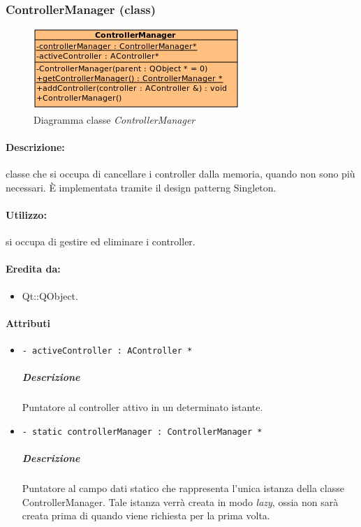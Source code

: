 	\subsubsection{ControllerManager (class)}
	\begin{figure}[!h]
		\centering
		\includegraphics[scale=2.75]{./Content/Immagini/controller/ControllerManager}
		\caption{Diagramma classe \textsl{ControllerManager}}
	\end{figure}
	\paragraph{Descrizione:} classe che si occupa di cancellare i controller dalla memoria, quando non sono più necessari. È implementata tramite il design patterng\g{} Singleton.
	\paragraph{Utilizzo:} si occupa di gestire ed eliminare i controller.
	\paragraph{Eredita da:}
		\begin{itemize}
			\item Qt::QObject.
		\end{itemize}
	\paragraph{Attributi}
		\begin{itemize}
			\item \color{teal} \verb!- activeController : AController *!
			\color{black}
			\subparagraph{Descrizione} Puntatore al controller attivo in un determinato istante.
			\item \color{teal} \verb!- static controllerManager : ControllerManager *!
			\color{black}
			\subparagraph{Descrizione} Puntatore al campo dati statico che rappresenta l'unica istanza della classe ControllerManager. Tale istanza verrà creata in modo \textit{lazy}, ossia non sarà creata prima di quando viene richiesta per la prima volta.
		\end{itemize}
